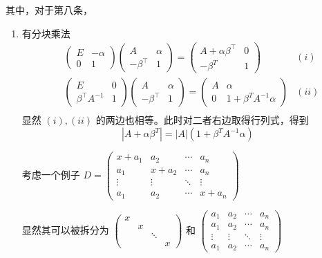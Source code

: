其中，对于第八条，
\begin{enumerate}
    \item 有分块乘法
    \begin{equation*}
        \begin{aligned}
            &\begin{pmatrix}
                E&-\alpha\\0&1
            \end{pmatrix}
            \begin{pmatrix}
                A&\alpha\\-\beta^\top&1
            \end{pmatrix} = 
            \begin{pmatrix}
                A+\alpha\beta^\top & 0 \\ -\beta^T & 1
            \end{pmatrix}&(i)\\
            &\begin{pmatrix}
                E&0\\\beta^\top A^{-1} & 1
            \end{pmatrix}
            \begin{pmatrix}
                A&\alpha\\-\beta^\top&1
            \end{pmatrix} = 
            \begin{pmatrix}
                A & \alpha \\ 0 & 1+\beta^TA^{-1}\alpha
            \end{pmatrix}&(ii)\\
        \end{aligned}
    \end{equation*}
    显然 $ (i),(ii) $ 的两边也相等。此时对二者右边取得行列式，得到$$
    |A + \alpha\beta^T| = |A|(1+\beta^TA^{-1}\alpha)
    $$ 

    考虑一个例子 $ D = \begin{pmatrix}
        x+a_1 & a_2 & \cdots& a_n\\ 
        a_1 & x+a_2 & \cdots& a_n\\ 
        \vdots & \vdots & \ddots & \vdots \\ 
        a_1 & a_2 & \cdots & x+a_n
    \end{pmatrix} $ 
    
    显然其可以被拆分为 $ \begin{pmatrix}
        x&&&\\ &x&& \\ &&\ddots& \\ &&&x
    \end{pmatrix} $ 和 $ \begin{pmatrix}
        a_1 & a_2 & \cdots& a_n\\ 
        a_1 & a_2 & \cdots& a_n\\ 
        \vdots & \vdots & \ddots & \vdots \\ 
        a_1 & a_2 & \cdots & a_n
    \end{pmatrix} $ 
    

\end{enumerate}

